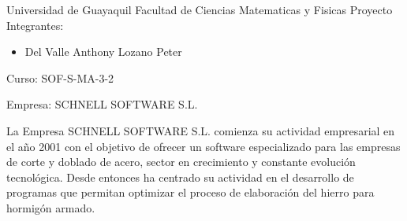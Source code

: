 \begin{center}
Universidad de Guayaquil
Facultad de Ciencias Matematicas y Fisicas
Proyecto
Integrantes:
\begin{itemize}
	\item Del Valle Anthony
Lozano Peter
\end{itemize}
Curso: SOF-S-MA-3-2
\end{center}

Empresa: SCHNELL SOFTWARE S.L.


La Empresa SCHNELL SOFTWARE S.L. comienza su actividad empresarial en el año 2001 con el objetivo de ofrecer un software especializado para las empresas de corte y doblado de acero, sector en crecimiento y constante evolución tecnológica. Desde entonces ha centrado su actividad en el desarrollo de programas que permitan optimizar el proceso de elaboración del hierro para hormigón armado.


